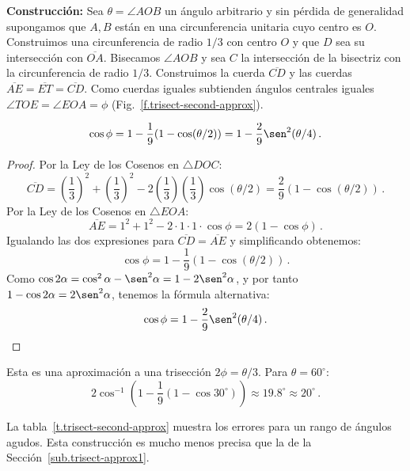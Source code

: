 \noindent\textbf{Construcción:}
Sea $\theta=\angle AOB$ un ángulo arbitrario y sin pérdida de generalidad supongamos que $A,B$ están en una circunferencia unitaria cuyo centro es $O$. Construimos una circunferencia de radio $1/3$ con centro $O$ y que $D$ sea su intersección con $\overline{OA}$. Bisecamos $\angle AOB$ y sea $C$ la intersección de la bisectriz con la circunferencia de radio $1/3$. Construimos la cuerda $\overline{CD}$ y las cuerdas $\overline{AE}=\overline{ET}=\overline{CD}$. Como cuerdas iguales subtienden ángulos centrales iguales $\angle TOE=\angle EOA=\phi$ (Fig.~\ref{f.trisect-second-approx}).

\begin{theorem}
\[
\cos\phi=1 - \frac{1}{9}(1-\cos(\theta/2))=1 - \frac{2}{9}\sen^2(\theta/4)\,.
\]
\end{theorem}
\begin{proof} Por la Ley de los Cosenos en $\triangle DOC$:
\[
\overline{CD}= \left(\frac{1}{3}\right)^2+\left(\frac{1}{3}\right)^2-2\left(\frac{1}{3}\right)\left(\frac{1}{3}\right)\cos (\theta/2)=\frac{2}{9}(1-\cos(\theta/2))\,.
\]
Por la Ley de los Cosenos en $\triangle EOA$:
\[
\overline{AE} = 1^2+1^2-2\cdot 1\cdot 1\cdot \cos \phi=2(1-\cos \phi)\,.
\]
Igualando las dos expresiones para $\overline{CD}=\overline{AE}$ y simplificando obtenemos:
\[
\cos \phi = 1 - \frac{1}{9}(1-\cos(\theta/2))\,.
\]
Como $\cos 2\alpha= \cos^2 \alpha-\sen^2\alpha=1-2\sen^2\alpha$, y por tanto $1-\cos 2\alpha=2\sen^2\alpha$, tenemos la fórmula alternativa:
\[
\cos \phi = 1 - \frac{2}{9}\sen^2(\theta/4)\,.
\]
\end{proof}

Esta es una aproximación a una trisección $2\phi=\theta/3$. Para $\theta=60^\circ$:
\[
2\cos^{-1}\left(1 - \frac{1}{9}(1-\cos 30^\circ)\right)\approx 19.8^\circ\approx 20^\circ\,.
\]

La tabla~\ref{t.trisect-second-approx} muestra los errores para un rango de ángulos agudos. Esta construcción es mucho menos precisa que la de la Sección~\ref{sub.trisect-approx1}.

